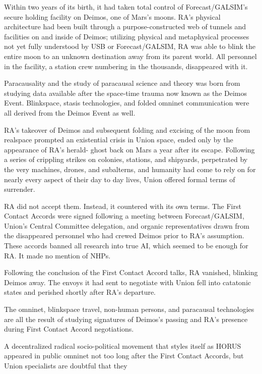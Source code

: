 Within two years of its birth, it had taken total control of Forecast/GALSIM’s secure holding
facility on Deimos, one of Mars’s moons. RA’s physical architecture had been built through a
purpose-constructed web of tunnels and facilities on and inside of Deimos; utilizing physical and
metaphysical processes not yet fully understood by USB or Forecast/GALSIM, RA was able to
blink the entire moon to an unknown destination away from its parent world. All personnel in the
facility, a station crew numbering in the thousands, disappeared with it.


Paracausality and the study of paracausal science and theory was born from studying data
available after the space-time trauma now known as the Deimos Event. Blinkspace, stasis
technologies, and folded omninet communication were all derived from the Deimos Event as
well.


RA’s takeover of Deimos and subsequent folding and excising of the moon from realspace
prompted an existential crisis in Union space, ended only by the appearance of RA’s herald-
ghost back on Mars a year after its escape. Following a series of crippling strikes on colonies,
stations, and shipyards, perpetrated by the very machines, drones, and subalterns, and humanity
had come to rely on for nearly every aspect of their day to day lives, Union offered formal terms
of surrender.


RA did not accept them. Instead, it countered with its own terms. The First Contact Accords
were signed following a meeting between Forecast/GALSIM, Union’s Central Committee
delegation, and organic representatives drawn from the disappeared personnel who had crewed
Deimos prior to RA’s assumption. These accords banned all research into true AI, which seemed
to be enough for RA. It made no mention of NHPs.


Following the conclusion of the First Contact Accord talks, RA vanished, blinking Deimos away.
The envoys it had sent to negotiate with Union fell into catatonic states and perished shortly after
RA’s departure.


The omninet, blinkspace travel, non-human persons, and paracausal technologies are all the
result of studying signatures of Deimos’s passing and RA’s presence during First Contact Accord
negotiations.


A decentralized radical socio-political movement that styles itself as HORUS appeared in public
omninet not too long after the First Contact Accords, but Union specialists are doubtful that they




